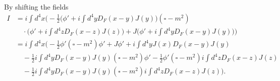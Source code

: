 By shifting the fields
\begin{equation}
	\begin{split}
		I&=i\int d^4x\bigg(-\frac{1}{2}\bigg(\phi'+i\int d^4y D_F(x-y)J(y)\bigg)(\square-m^2)\\
		&\quad\cdot\bigg(\phi'+i\int d^4z D_F(x-z)J(z)\bigg)+J\bigg(\phi'+i\int d^4y D_F(x-y)J(y))\bigg)\\
		&=i\int d^4x\bigg(-\frac{1}{2}\phi'(\square-m^2)\phi'+J\phi'+i\int d^4yJ(x) D_F(x-y)J(y)\\
		&\quad-\frac{1}{2}i\int d^4y D_F(x-y)J(y)(\square-m^2)\phi'-\frac{1}{2}\phi'(\square-m^2)i\int d^4z D_F(x-z)J(z)\\
		&\quad-\frac{1}{2}i\int d^4y D_F(x-y)J(y)(\square-m^2)i\int d^4z D_F(x-z)J(z)\bigg).\\
	\end{split}
\end{equation} 


